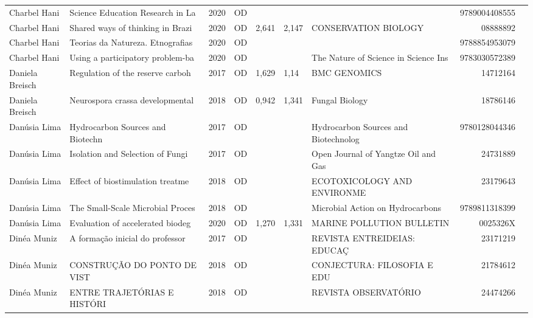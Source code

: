 \documentclass[12pt,brazil]{article}\usepackage[]{graphicx}\usepackage[]{xcolor}
\begin{document}
\begin{longtable}{lllrrllrr}
Charbel Hani & Science Education Research in La & 2020 & OD &  &  &  & 9789004408555 \\
Charbel Hani & Shared ways of thinking in Brazi & 2020 & OD & 2,641 & 2,147 & CONSERVATION BIOLOGY & 08888892 \\
Charbel Hani & Teorias da Natureza. Etnografias & 2020 & OD &  &  &  & 9788854953079 \\
Charbel Hani & Using a participatory problem-ba & 2020 & OD &  &  & The Nature of Science in Science Ins & 9783030572389 \\
Daniela Breisch & Regulation of the reserve carboh & 2017 & OD & 1,629 & 1,14 & BMC GENOMICS & 14712164 \\
Daniela Breisch & Neurospora crassa developmental  & 2018 & OD & 0,942 & 1,341 & Fungal Biology & 18786146 \\
Danúsia Lima & Hydrocarbon Sources and Biotechn & 2017 & OD &  &  & Hydrocarbon Sources and Biotechnolog & 9780128044346 \\
\rowcolor{coautr}\rowcolor{coautr}\rowcolor{coautr}\rowcolor{coautr}\rowcolor{coautr}\rowcolor{coautr}\rowcolor{coautr}\rowcolor{coautr}\rowcolor{coautr}\rowcolor{coautr}\rowcolor{coautr}\rowcolor{coautr}\rowcolor{coautr}\rowcolor{coautr}\rowcolor{coautr}\rowcolor{coautr}Danúsia Lima & Isolation and Selection of Fungi & 2017 & OD &  &  & Open Journal of Yangtze Oil and Gas & 24731889 \\
Danúsia Lima & Effect of biostimulation treatme & 2018 & OD &  &  & ECOTOXICOLOGY AND ENVIRONME & 23179643 \\
\rowcolor{coautr}\rowcolor{coautr}\rowcolor{coautr}\rowcolor{coautr}\rowcolor{coautr}\rowcolor{coautr}\rowcolor{coautr}\rowcolor{coautr}\rowcolor{coautr}\rowcolor{coautr}\rowcolor{coautr}\rowcolor{coautr}\rowcolor{coautr}\rowcolor{coautr}\rowcolor{coautr}\rowcolor{coautr}Danúsia Lima & The Small-Scale Microbial Proces & 2018 & OD &  &  & Microbial Action on Hydrocarbons & 9789811318399 \\
Danúsia Lima & Evaluation of accelerated biodeg & 2020 & OD & 1,270 & 1,331 & MARINE POLLUTION BULLETIN & 0025326X \\
Dinéa Muniz & A formação inicial do professor  & 2017 & OD &  &  & REVISTA ENTREIDEIAS: EDUCAÇ & 23171219 \\
Dinéa Muniz & CONSTRUÇÃO DO PONTO DE VIST & 2018 & OD &  &  & CONJECTURA: FILOSOFIA E EDU & 21784612 \\
Dinéa Muniz & ENTRE TRAJETÓRIAS E HISTÓRI & 2018 & OD &  &  & REVISTA OBSERVATÓRIO & 24474266 \\

\end{longtable}
\end{document}
